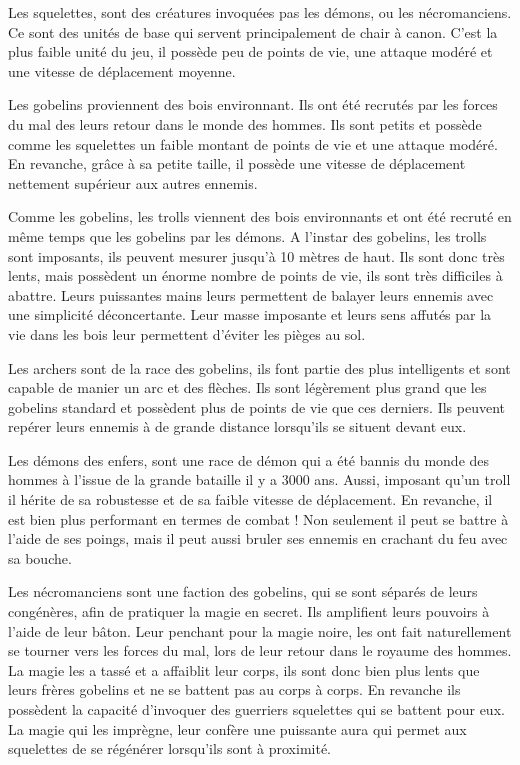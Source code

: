 \documentclass[a4paper, 12pt]{article}
\begin{document}
\par Les squelettes, sont des créatures invoquées pas les démons, ou les nécromanciens. Ce sont des unités de base qui servent principalement de chair à canon. C’est la plus faible unité du jeu, il possède peu de points de vie, une attaque modéré et une vitesse de déplacement moyenne.
\par Les gobelins proviennent des bois environnant. Ils ont été recrutés par les forces du mal des leurs retour dans le monde des hommes. Ils sont petits et possède comme les squelettes un faible montant de points de vie et une attaque modéré. En revanche, grâce à sa petite taille, il possède une vitesse de déplacement nettement supérieur aux autres ennemis.
\par Comme les gobelins, les trolls viennent des bois environnants et ont été recruté en même temps que les gobelins par les démons. A l’instar des gobelins, les trolls sont imposants, ils peuvent mesurer jusqu’à 10 mètres de haut. Ils sont donc très lents, mais possèdent un énorme nombre de points de vie, ils sont très difficiles à abattre. Leurs puissantes mains leurs permettent de balayer leurs ennemis avec une simplicité déconcertante. Leur masse imposante et leurs sens affutés par la vie dans les bois leur permettent d’éviter les pièges au sol.
\par Les archers sont de la race des gobelins, ils font partie des plus intelligents et sont capable de manier un arc et des flèches. Ils sont légèrement plus grand que les gobelins standard et possèdent plus de points de vie que ces derniers. Ils peuvent repérer leurs ennemis à de grande distance lorsqu’ils se situent devant eux.
\par Les démons des enfers, sont une race de démon qui a été bannis du monde des hommes à l’issue de la grande bataille il y a 3000 ans. Aussi, imposant qu’un troll il hérite de sa robustesse et de sa faible vitesse de déplacement. En revanche, il est bien plus performant en termes de combat ! Non seulement il peut se battre à l’aide de ses poings, mais il peut aussi bruler ses ennemis en crachant du feu avec sa bouche.
\par Les nécromanciens sont une faction des gobelins, qui se sont séparés de leurs congénères, afin de pratiquer la magie en secret. Ils amplifient leurs pouvoirs à l’aide de leur bâton. Leur penchant pour la magie noire, les ont fait naturellement se tourner vers les forces du mal, lors de leur retour dans le royaume des hommes. La magie les a tassé et a affaiblit leur corps, ils sont donc bien plus lents que leurs frères gobelins et ne se battent pas au corps à corps. En revanche ils possèdent la capacité d’invoquer des guerriers squelettes qui se battent pour eux. La magie qui les imprègne, leur confère une puissante aura qui permet aux squelettes de se régénérer lorsqu’ils sont à proximité.
\end{document}

